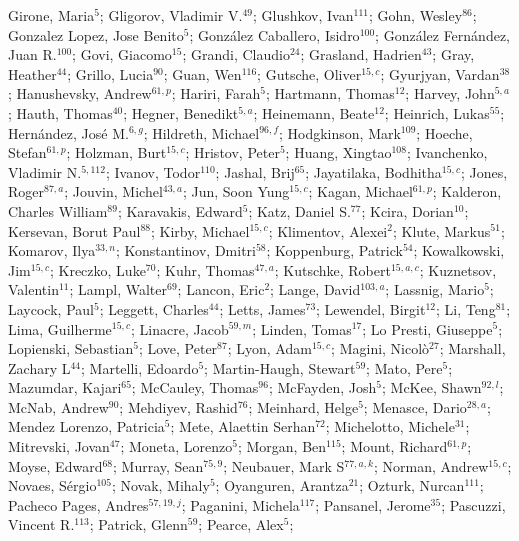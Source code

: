 Girone, Maria$^{5}$;
Gligorov, Vladimir V.$^{49}$;
Glushkov, Ivan$^{111}$;
Gohn, Wesley$^{86}$;
Gonzalez Lopez, Jose Benito$^{5}$;
González Caballero, Isidro$^{100}$;
González Fernández, Juan R.$^{100}$;
Govi, Giacomo$^{15}$;
Grandi, Claudio$^{24}$;
Grasland, Hadrien$^{43}$;
Gray, Heather$^{44}$;
Grillo, Lucia$^{90}$;
Guan, Wen$^{116}$;
Gutsche, Oliver$^{15,c}$;
Gyurjyan, Vardan$^{38}$;
Hanushevsky, Andrew$^{61,p}$;
Hariri, Farah$^{5}$;
Hartmann, Thomas$^{12}$;
Harvey, John$^{5,a}$;
Hauth, Thomas$^{40}$;
Hegner, Benedikt$^{5,a}$;
Heinemann, Beate$^{12}$;
Heinrich, Lukas$^{55}$;
Hernández, José M.$^{6,g}$;
Hildreth, Michael$^{96,f}$;
Hodgkinson, Mark$^{109}$;
Hoeche, Stefan$^{61,p}$;
Holzman, Burt$^{15,c}$;
Hristov, Peter$^{5}$;
Huang, Xingtao$^{108}$;
Ivanchenko, Vladimir N.$^{5,112}$;
Ivanov, Todor$^{110}$;
Jashal, Brij$^{65}$;
Jayatilaka, Bodhitha$^{15,c}$;
Jones, Roger$^{87,a}$;
Jouvin, Michel$^{43,a}$;
Jun, Soon Yung$^{15,c}$;
Kagan, Michael$^{61,p}$;
Kalderon, Charles William$^{89}$;
Karavakis, Edward$^{5}$;
Katz, Daniel S.$^{77}$;
Kcira, Dorian$^{10}$;
Kersevan, Borut Paul$^{88}$;
Kirby, Michael$^{15,c}$;
Klimentov, Alexei$^{2}$;
Klute, Markus$^{51}$;
Komarov, Ilya$^{33,n}$;
Konstantinov, Dmitri$^{58}$;
Koppenburg, Patrick$^{54}$;
Kowalkowski, Jim$^{15,c}$;
Kreczko, Luke$^{70}$;
Kuhr, Thomas$^{47,a}$;
Kutschke, Robert$^{15,a,c}$;
Kuznetsov, Valentin$^{11}$;
Lampl, Walter$^{69}$;
Lancon, Eric$^{2}$;
Lange, David$^{103,a}$;
Lassnig, Mario$^{5}$;
Laycock, Paul$^{5}$;
Leggett, Charles$^{44}$;
Letts, James$^{73}$;
Lewendel, Birgit$^{12}$;
Li, Teng$^{81}$;
Lima, Guilherme$^{15,c}$;
Linacre, Jacob$^{59,m}$;
Linden, Tomas$^{17}$;
Lo Presti, Giuseppe$^{5}$;
Lopienski, Sebastian$^{5}$;
Love, Peter$^{87}$;
Lyon, Adam$^{15,c}$;
Magini, Nicolò$^{27}$;
Marshall, Zachary L$^{44}$;
Martelli, Edoardo$^{5}$;
Martin-Haugh, Stewart$^{59}$;
Mato, Pere$^{5}$;
Mazumdar, Kajari$^{65}$;
McCauley, Thomas$^{96}$;
McFayden, Josh$^{5}$;
McKee, Shawn$^{92,l}$;
McNab, Andrew$^{90}$;
Mehdiyev, Rashid$^{76}$;
Meinhard, Helge$^{5}$;
Menasce, Dario$^{28,a}$;
Mendez Lorenzo, Patricia$^{5}$;
Mete, Alaettin Serhan$^{72}$;
Michelotto, Michele$^{31}$;
Mitrevski, Jovan$^{47}$;
Moneta, Lorenzo$^{5}$;
Morgan, Ben$^{115}$;
Mount, Richard$^{61,p}$;
Moyse, Edward$^{68}$;
Murray, Sean$^{75,9}$;
Neubauer, Mark S$^{77,a,k}$;
Norman, Andrew$^{15,c}$;
Novaes, Sérgio$^{105}$;
Novak, Mihaly$^{5}$;
Oyanguren, Arantza$^{21}$;
Ozturk, Nurcan$^{111}$;
Pacheco Pages, Andres$^{57,19,j}$;
Paganini, Michela$^{117}$;
Pansanel, Jerome$^{35}$;
Pascuzzi, Vincent R.$^{113}$;
Patrick, Glenn$^{59}$;
Pearce, Alex$^{5}$;
